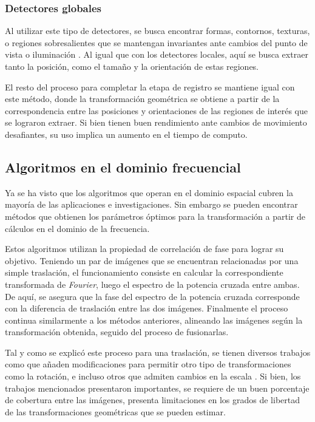 \subsubsection*{Detectores globales}

Al utilizar este tipo de detectores, se busca encontrar formas, contornos, texturas, o regiones sobresalientes que se mantengan invariantes ante cambios del punto de vista o iluminación \cite{high-level}. Al igual que con los detectores locales, aquí se busca extraer tanto la posición, como el tamaño y la orientación de estas regiones.

El resto del proceso para completar la etapa de registro se mantiene igual con este método, donde la transformación geométrica se obtiene a partir de la correspondencia entre las posiciones y orientaciones de las regiones de interés que se lograron extraer. Si bien tienen buen rendimiento ante cambios de movimiento desafiantes, su uso implica un aumento en el tiempo de computo.

\subsection*{Algoritmos en el dominio frecuencial}

Ya se ha visto que los algoritmos que operan en el dominio espacial cubren la mayoría de las aplicaciones e investigaciones. Sin embargo se pueden encontrar métodos que obtienen los parámetros óptimos para la transformación a partir de cálculos en el dominio de la frecuencia. 

Estos algoritmos utilizan la propiedad de correlación de fase para lograr su objetivo. Teniendo un par de imágenes que se encuentran relacionadas por una simple traslación, el funcionamiento consiste en calcular la correspondiente transformada de \textit{Fourier}, luego el espectro de la potencia cruzada entre ambas. De aquí, se asegura que la fase del espectro de la potencia cruzada corresponde con la diferencia de traslación entre las dos imágenes. Finalmente el proceso continua similarmente a los métodos anteriores, alineando las imágenes según la transformación obtenida, seguido del proceso de fusionarlas.

Tal y como se explicó este proceso para una traslación, se tienen diversos trabajos como \cite{phase-rot} que añaden modificaciones para permitir otro tipo de transformaciones como la rotación, e incluso otros que admiten cambios en la escala \cite{phase-scale}. Si bien, los trabajos mencionados presentaron importantes, se requiere de un buen porcentaje de cobertura entre las imágenes, presenta limitaciones en los grados de libertad de las transformaciones geométricas que se pueden estimar.



